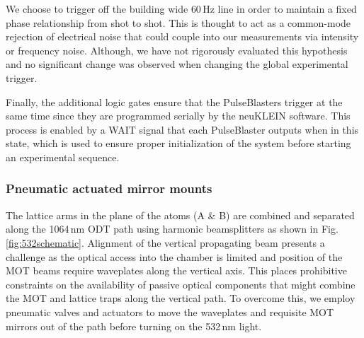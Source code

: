 We choose to trigger off the building wide $60$\,Hz line in order to maintain a fixed phase relationship from shot to shot.
This is thought to act as a common-mode rejection of electrical noise that could couple into our measurements via intensity or frequency noise.
Although, we have not rigorously evaluated this hypothesis and no significant change was observed when changing the global experimental trigger.

Finally, the additional logic gates ensure that the PulseBlasters trigger at the same time since they are programmed serially by the neuKLEIN software.
This process is enabled by a WAIT signal that each PulseBlaster outputs when in this state, which is used to ensure proper initialization of the system before starting an experimental sequence.

\subsubsection{Pneumatic actuated mirror mounts}
The lattice arms in the plane of the atoms (A \& B) are combined and separated along the 1064\,nm ODT path using harmonic beamsplitters as shown in Fig.\,\ref{fig:532schematic}.
Alignment of the vertical propagating beam presents a challenge as the optical access into the chamber is limited and position of the MOT beams require waveplates along the vertical axis. %
This places prohibitive constraints on the availability of passive optical components that might combine the MOT and lattice traps along the vertical path.
To overcome this, we employ pneumatic valves and actuators to move the waveplates and requisite MOT mirrors out of the path before turning on the 532\,nm light.


